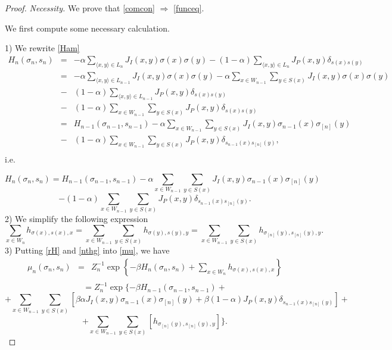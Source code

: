 \documentclass[10pt,a4paper]{amsart}
\begin{document}
\begin{proof}
\emph{Necessity.} We prove that \eqref{comcon} $\Rightarrow$ \eqref{funceq}.

We first compute some necessary calculation.

1) We rewrite \eqref{Ham}
\begin{eqnarray*}
H_n(\sigma_n, s_n)&=&-\alpha \sum_{\langle x,y\rangle \in L_n}J_{I}(x,y)\sigma(x)\sigma(y)-(1-\alpha)\sum_{\langle x,y\rangle \in L_n}J_{P}(x,y)\delta_{s(x)s(y)}\\[2mm]
&=&-\alpha \sum_{\langle x,y\rangle \in L_{n-1}}J_{I}(x,y)\sigma(x)\sigma(y)
-\alpha\sum_{x\in W_{n-1}}\sum_{y\in S(x)}J_{I}(x,y)\sigma(x)\sigma(y)\\[2mm]
&-&(1-\alpha) \sum_{\langle x,y\rangle \in L_{n-1}}J_{P}(x,y)\delta_{s(x)s(y)}\\[2mm]
&-&(1-\alpha)\sum_{x\in W_{n-1}}\sum_{y\in S(x)}J_{P}(x,y)\delta_{s(x)s(y)}\\[2mm]
&=&H_{n-1}(\sigma_{n-1}, s_{n-1})-\alpha\sum_{x\in W_{n-1}}\sum_{y\in S(x)}J_{I}(x,y)\sigma_{n-1}(x)\sigma_{[n]}(y)\\[2mm]
&-&(1-\alpha)\sum_{x\in W_{n-1}}\sum_{y\in S(x)}J_{P}(x,y)\delta_{s_{n-1}(x)s_{[n]}(y)},\\[2mm]
\end{eqnarray*}
i.e.

$$H_n(\sigma_n, s_n)=H_{n-1}(\sigma_{n-1}, s_{n-1})-\alpha\sum_{x\in W_{n-1}}\sum_{y\in S(x)}J_{I}(x,y)\sigma_{n-1}(x)\sigma_{[n]}(y)$$
\begin{equation}\label{rH}
-(1-\alpha)\sum_{x\in W_{n-1}}\sum_{y\in S(x)}J_{P}(x,y)\delta_{s_{n-1}(x)s_{[n]}(y)}.
\end{equation}
2) We simplify the following expression
\begin{equation}\label{nthg}
\sum _{x\in W_n}h_{\sigma(x),s(x),x}=\sum_{x\in W_{n-1}}\sum_{y\in S(x)}h_{\sigma(y),s(y),y}=\sum_{x\in W_{n-1}}\sum_{y\in S(x)}h_{\sigma_{[n]}(y),s_{[n]}(y),y}.
\end{equation}
3) Putting \eqref{rH} and \eqref{nthg} into \eqref{mu}, we have
\begin{eqnarray*}
\mu_{n}(\sigma_n, s_n)&=&Z_{n}^{-1}\exp\left\{-\beta H_n(\sigma_n,s_n)+\sum _{x\in
W_n}h_{\sigma(x),s(x),x}\right\}\\[2mm]
\end{eqnarray*}
$$=Z_n^{-1}\exp\{-\beta H_{n-1}(\sigma_{n-1},s_{n-1})+$$ $$+\sum_{x\in W_{n-1}}\sum_{y\in S(x)}\left[\beta \alpha  J_{I}(x,y)\sigma_{n-1}(x)\sigma_{[n]}(y)
+\beta (1-\alpha) J_{P}(x,y)\delta_{s_{n-1}(x)s_{[n]}(y)}\right]+$$ $$+\sum_{x\in W_{n-1}}\sum_{y\in S(x)}\left[ h_{\sigma_{[n]}(y),s_{[n]}(y),y}\right]\}.$$


\end{proof}
\end{document}
